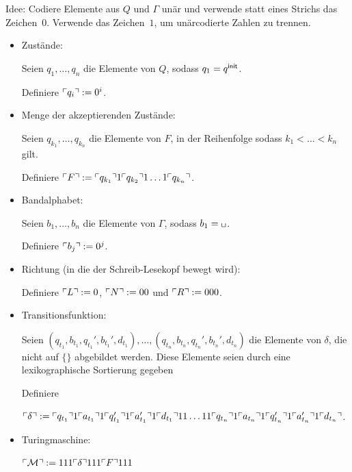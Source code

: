 Idee: Codiere Elemente aus $Q$ und $\Gamma$ unär und verwende statt eines Strichs das Zeichen~$0$.
Verwende das Zeichen~$1$, um unärcodierte Zahlen zu trennen.

\begin{itemize}
 \item Zustände:
 
    Seien $q_1,\dots, q_{n}$ die Elemente von $Q$, sodass $q_1=q^\mathsf{init}$.
    
    Definiere $\ulcorner q_i \urcorner:=0^i$.
    
  \item Menge der akzeptierenden Zustände:
  
    Seien $q_{k_1},\dots, q_{k_n}$ die Elemente von $F$, in der Reihenfolge sodass $k_1<\ldots <k_n$ gilt.
    
    Definiere $\ulcorner F \urcorner:=\ulcorner q_{k_1} \urcorner 1 \ulcorner q_{k_2} \urcorner 1 \ldots 1 \ulcorner q_{k_n} \urcorner$.
    
  \item Bandalphabet:
  
    Seien $b_1,\dots, b_{n}$ die Elemente von $\Gamma$, sodass $b_1=\blank$.
    
    Definiere $\ulcorner b_j \urcorner:=0^j$.
    
  \item Richtung (in die der Schreib-Lesekopf bewegt wird):
  
    Definiere $\ulcorner L \urcorner:=0$, $\ulcorner N \urcorner:=00$ und $\ulcorner R \urcorner:=000$.
    
  \item Transitionsfunktion:
  
   Seien $(q_{t_1}, b_{t_1}, q_{t_1}', b_{t_1}', d_{t_1}),\dots, (q_{t_n}, b_{t_n}, q_{t_n}', b_{t_n}', d_{t_n})$ 
   die Elemente von $\delta$, die nicht auf $\{\}$ abgebildet werden.
   Diese Elemente seien durch eine lexikographische Sortierung gegeben
  
   Definiere
   
   $\ulcorner \delta \urcorner:= \ulcorner q_{t_1} \urcorner1\ulcorner a_{t_1} \urcorner1\ulcorner q_{t_1}' \urcorner1\ulcorner a_{t_1}' \urcorner1\ulcorner d_{t_1} \urcorner11\dots 11 \ulcorner q_{t_n} \urcorner1\ulcorner a_{t_n} \urcorner1\ulcorner q_{t_n}' \urcorner1 \ulcorner a_{t_n}' \urcorner1\ulcorner d_{t_n} \urcorner$.
   
   \item Turingmaschine:
   
   $\ulcorner \mathcal{M} \urcorner:=111\ulcorner \delta \urcorner111\ulcorner F \urcorner111$
\end{itemize}


